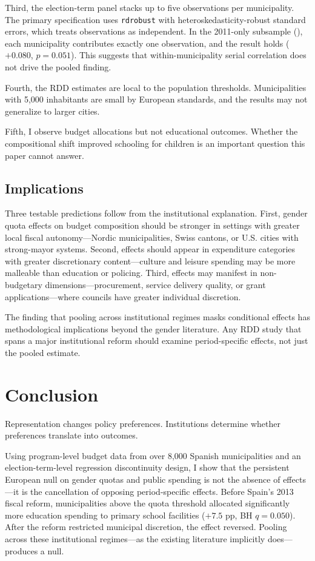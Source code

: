 \documentclass[12pt]{article}
\begin{document}
Third, the election-term panel stacks up to five observations per municipality. The primary specification uses \texttt{rdrobust} with heteroskedasticity-robust standard errors, which treats observations as independent. In the 2011-only subsample (), each municipality contributes exactly one observation, and the result holds ($+0.080$, $p = 0.051$). This suggests that within-municipality serial correlation does not drive the pooled finding.

Fourth, the RDD estimates are local to the population thresholds. Municipalities with 5,000 inhabitants are small by European standards, and the results may not generalize to larger cities.

Fifth, I observe budget allocations but not educational outcomes. Whether the compositional shift improved schooling for children is an important question this paper cannot answer.

\subsection{Implications}

Three testable predictions follow from the institutional explanation. First, gender quota effects on budget composition should be stronger in settings with greater local fiscal autonomy---Nordic municipalities, Swiss cantons, or U.S. cities with strong-mayor systems. Second, effects should appear in expenditure categories with greater discretionary content---culture and leisure spending may be more malleable than education or policing. Third, effects may manifest in non-budgetary dimensions---procurement, service delivery quality, or grant applications---where councils have greater individual discretion.

The finding that pooling across institutional regimes masks conditional effects has methodological implications beyond the gender literature. Any RDD study that spans a major institutional reform should examine period-specific effects, not just the pooled estimate.


\section{Conclusion}

Representation changes policy preferences. Institutions determine whether preferences translate into outcomes.

Using program-level budget data from over 8,000 Spanish municipalities and an election-term-level regression discontinuity design, I show that the persistent European null on gender quotas and public spending is not the absence of effects---it is the cancellation of opposing period-specific effects. Before Spain's 2013 fiscal reform, municipalities above the quota threshold allocated significantly more education spending to primary school facilities ($+7.5$ pp, BH $q = 0.050$). After the reform restricted municipal discretion, the effect reversed. Pooling across these institutional regimes---as the existing literature implicitly does---produces a null.
\end{document}
